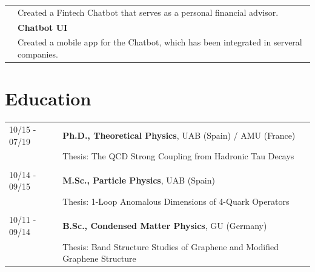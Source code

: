 \documentclass[11pt]{article}
\begin{document}
\begin{minipage}[t]{0.65\textwidth}
\begin{tabularx}{\textwidth}{lX}
                & \small Created a Fintech Chatbot that serves as a personal financial
                  advisor.\\
                & \small \textbf{Chatbot UI} \\
                & \small Created a mobile app for the Chatbot, which has been
                  integrated in serveral companies.
\end{tabularx}

\vspace{0.3cm}

\section*{Education}
\begin{small}
\begin{tabularx}{\textwidth}{lX}
  10/15 - 07/19 & \textbf{Ph.D., Theoretical Physics}, UAB (Spain) / AMU (France) \\
                & Thesis: The QCD Strong Coupling from Hadronic Tau
                  Decays \\\\
  10/14 - 09/15 & \textbf{M.Sc., Particle Physics}, UAB (Spain) \\
                & Thesis: 1-Loop Anomalous Dimensions of 4-Quark
                  Operators \\\\
  10/11 - 09/14 & \textbf{B.Sc., Condensed Matter Physics}, GU (Germany) \\
                & Thesis: Band Structure Studies of Graphene and Modified
                  Graphene Structure
\end{tabularx}


\end{small}
\end{minipage}
\end{document}
